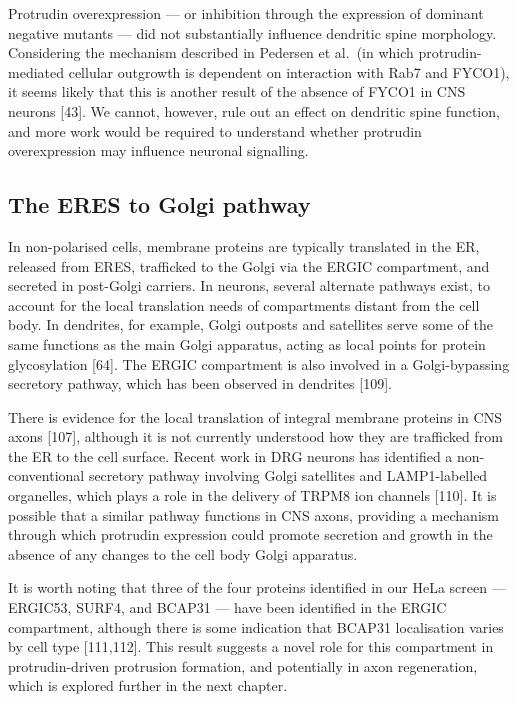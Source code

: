 \documentclass[
  12pt,
  a4paper,
]{book}
\begin{document}
Protrudin overexpression --- or inhibition through the expression of dominant negative mutants --- did not substantially influence dendritic spine morphology. Considering the mechanism described in Pedersen et al.~(in which protrudin-mediated cellular outgrowth is dependent on interaction with Rab7 and FYCO1), it seems likely that this is another result of the absence of FYCO1 in CNS neurons {[}43{]}. We cannot, however, rule out an effect on dendritic spine function, and more work would be required to understand whether protrudin overexpression may influence neuronal signalling.

\hypertarget{the-eres-to-golgi-pathway}{%
\subsection{The ERES to Golgi pathway}\label{the-eres-to-golgi-pathway}}

In non-polarised cells, membrane proteins are typically translated in the ER, released from ERES, trafficked to the Golgi via the ERGIC compartment, and secreted in post-Golgi carriers. In neurons, several alternate pathways exist, to account for the local translation needs of compartments distant from the cell body. In dendrites, for example, Golgi outposts and satellites serve some of the same functions as the main Golgi apparatus, acting as local points for protein glycosylation {[}64{]}. The ERGIC compartment is also involved in a Golgi-bypassing secretory pathway, which has been observed in dendrites {[}109{]}.

There is evidence for the local translation of integral membrane proteins in CNS axons {[}107{]}, although it is not currently understood how they are trafficked from the ER to the cell surface. Recent work in DRG neurons has identified a non-conventional secretory pathway involving Golgi satellites and LAMP1-labelled organelles, which plays a role in the delivery of TRPM8 ion channels {[}110{]}. It is possible that a similar pathway functions in CNS axons, providing a mechanism through which protrudin expression could promote secretion and growth in the absence of any changes to the cell body Golgi apparatus.

It is worth noting that three of the four proteins identified in our HeLa screen --- ERGIC53, SURF4, and BCAP31 --- have been identified in the ERGIC compartment, although there is some indication that BCAP31 localisation varies by cell type {[}111,112{]}. This result suggests a novel role for this compartment in protrudin-driven protrusion formation, and potentially in axon regeneration, which is explored further in the next chapter.
\end{document}
